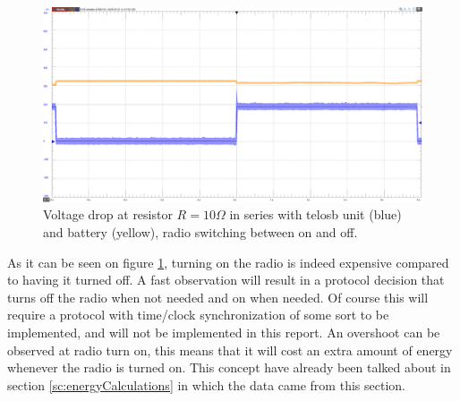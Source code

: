 \begin{figure}[h]
	\centering
	\includegraphics[width=\linewidth]{implementation/energylab/fig/radioSwitching.png}
	\caption{Voltage drop at resistor $R=10\Omega$ in series with telosb unit (blue) and battery (yellow), radio switching between on and off.}
	\label{fig:radioSwitching}
\end{figure}

\noindent As it can be seen on figure \ref{fig:radioSwitching}, turning on the radio is indeed expensive compared to having it turned off. A fast observation will result in a protocol decision that turns off the radio when not needed and on when needed. Of course this will require a protocol with time/clock synchronization of some sort to be implemented, and will not be implemented in this report. An overshoot can be observed at radio turn on, this means that it will cost an extra amount of energy whenever the radio is turned on. This concept have already been talked about in section \ref{sc:energyCalculations} in which the data came from this section.